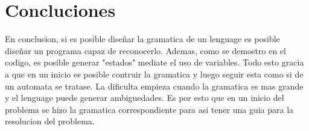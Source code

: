 \documentclass[conference]{IEEEtran}
\begin{document}
\section{Concluciones}

En conclusion, si es posible diseñar la gramatica de un lenguage es posible diseñar un programa capaz de reconocerlo. Ademas, como se demostro en el codigo, es posible generar "estados" mediate el uso de variables. Todo esto gracia a que en un inicio es posible contruir la gramatica y luego seguir esta como si de un automata se tratase. La dificulta empieza cuando la gramatica es mas grande y el lenguage puede generar ambiguedades. Es por esto que en un inicio del problema se hizo la gramatica correspondiente para asi tener una guia para la resolucion del problema.
\end{document}
